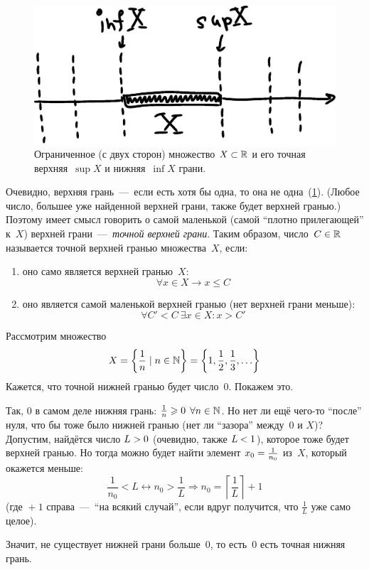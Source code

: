 \documentclass[a4paper,12pt]{article}
\begin{document}
  \begin{figure}[ht]
    \centering
    \includegraphics[width=0.6\linewidth]{images/sup-inf}
    
    \caption{
      Ограниченное (с двух сторон) множество $X \hm\subset \RR$ и его точная верхняя~$\sup X$ и нижняя~$\inf X$ грани.
    }
    \label{fig:sup-inf}
  \end{figure}
  
  Очевидно, верхняя грань~---~если есть хотя бы одна, то она не одна~(\ref{fig:sup-inf}).
  (Любое число, большее уже найденной верхней грани, также будет верхней гранью.)
  Поэтому имеет смысл говорить о самой маленькой (самой ``плотно прилегающей'' к~$X$) верхней грани~---~\emph{точной верхней грани}.
  Таким образом, число~$C \hm\in \RR$ называется точной верхней гранью множества~$X$, если:
  \begin{enumerate}
    \item оно само является верхней гранью~$X$:
      \[
        \forall x \in X \to x \leq C
      \]
    \item оно является самой маленькой верхней гранью (нет верхней грани меньше):
      \[
        \forall C' < C\ \exists x \in X\colon x > C'
      \]
  \end{enumerate}
  
  
  \begin{example}
    Рассмотрим множество
    \[
      X \hm= \left\{\frac{1}{n} \mid n \in \NN \right\} = \left\{1, \frac{1}{2}, \frac{1}{3}, \ldots\right\}
    \]
    Кажется, что точной нижней гранью будет число~$0$.
    Покажем это.
    
    Так, $0$ в самом деле нижняя грань: $\frac{1}{n} \hm\geq 0$ $\forall n \hm\in \NN$.
    Но нет ли ещё чего-то ``после'' нуля, что бы тоже было нижней гранью (нет ли ``зазора'' между~$0$ и $X$)?
    Допустим, найдётся число $L \hm> 0$ (очевидно, также $L \hm< 1$), которое тоже будет верхней гранью.
    Но тогда можно будет найти элемент $x_0 \hm= \frac{1}{n_0}$ из~$X$, который окажется меньше:
    \[
      \frac{1}{n_0} < L \leftrightarrow n_0 > \frac{1}{L} \Rightarrow n_0 = \left\lceil\frac{1}{L}\right\rceil + 1
    \]
    (где ${} + 1$ справа~---~``на всякий случай'', если вдруг получится, что $\frac{1}{L}$ уже само целое).
    
    Значит, не существует нижней грани больше~$0$, то есть~$0$ есть точная нижняя грань.
  \end{example}
  
\end{document}
